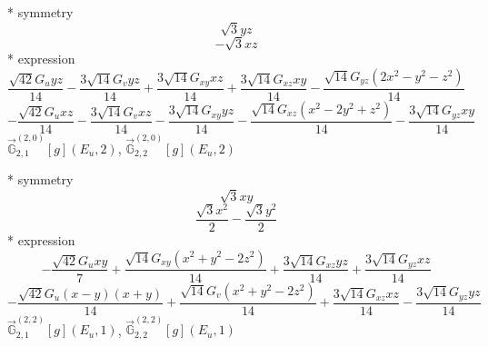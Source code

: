 \documentclass[fleqn,8pt]{jsarticle}
\begin{document}
\noindent\quad ** symmetry
\begin{dmath*}
\sqrt{3} y z
\end{dmath*}
\begin{dmath*}
- \sqrt{3} x z
\end{dmath*}
\noindent\quad ** expression
\begin{dmath*}
\frac{\sqrt{42} G_{u} y z}{14} - \frac{3 \sqrt{14} G_{v} y z}{14} + \frac{3 \sqrt{14} G_{xy} x z}{14} + \frac{3 \sqrt{14} G_{xz} x y}{14} - \frac{\sqrt{14} G_{yz} \left(2 x^{2} - y^{2} - z^{2}\right)}{14}
\end{dmath*}
\begin{dmath*}
- \frac{\sqrt{42} G_{u} x z}{14} - \frac{3 \sqrt{14} G_{v} x z}{14} - \frac{3 \sqrt{14} G_{xy} y z}{14} - \frac{\sqrt{14} G_{xz} \left(x^{2} - 2 y^{2} + z^{2}\right)}{14} - \frac{3 \sqrt{14} G_{yz} x y}{14}
\end{dmath*}
\noindent\quad $\vec{\mathbb{G}}_{2,1}^{(2,0)}[g](E_{u},2)$, $\vec{\mathbb{G}}_{2,2}^{(2,0)}[g](E_{u},2)$

\noindent\quad ** symmetry
\begin{dmath*}
\sqrt{3} x y
\end{dmath*}
\begin{dmath*}
\frac{\sqrt{3} x^{2}}{2} - \frac{\sqrt{3} y^{2}}{2}
\end{dmath*}
\noindent\quad ** expression
\begin{dmath*}
- \frac{\sqrt{42} G_{u} x y}{7} + \frac{\sqrt{14} G_{xy} \left(x^{2} + y^{2} - 2 z^{2}\right)}{14} + \frac{3 \sqrt{14} G_{xz} y z}{14} + \frac{3 \sqrt{14} G_{yz} x z}{14}
\end{dmath*}
\begin{dmath*}
- \frac{\sqrt{42} G_{u} \left(x - y\right) \left(x + y\right)}{14} + \frac{\sqrt{14} G_{v} \left(x^{2} + y^{2} - 2 z^{2}\right)}{14} + \frac{3 \sqrt{14} G_{xz} x z}{14} - \frac{3 \sqrt{14} G_{yz} y z}{14}
\end{dmath*}
\noindent\quad $\vec{\mathbb{G}}_{2,1}^{(2,2)}[g](E_{u},1)$, $\vec{\mathbb{G}}_{2,2}^{(2,2)}[g](E_{u},1)$
\end{document}
